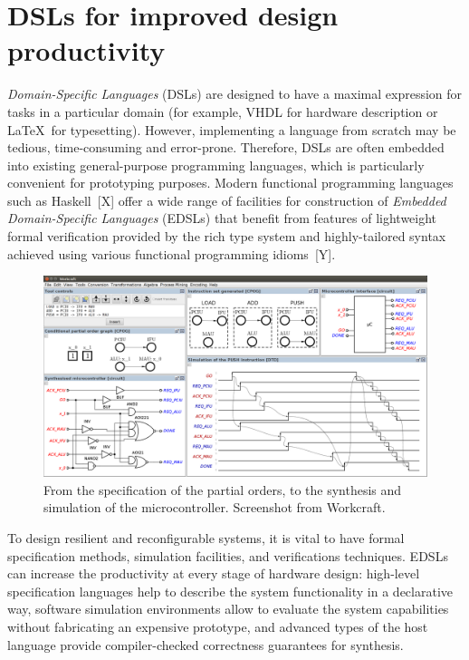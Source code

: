 \documentclass[conference]{IEEEtran}
\begin{document}
\section{DSLs for improved design productivity\label{sec:dsl}}

\emph{Domain-Specific Languages} (DSLs) are designed to have a maximal expression for
tasks in a particular domain (for example, VHDL for hardware description or
\LaTeX~for typesetting). However, implementing a language from scratch may be tedious,
time-consuming and error-prone. Therefore, DSLs are often embedded into existing general-purpose programming languages, which is particularly convenient for
prototyping purposes.
Modern functional programming languages such as Haskell~[X] offer a
wide range of facilities for construction of \emph{Embedded Domain-Specific Languages}
(EDSLs) that benefit from features of lightweight formal verification provided by
the rich type system and highly-tailored syntax achieved using various functional
programming idioms~[Y].

\begin{figure}[ht!]
\begin{center}
    \includegraphics[width=\linewidth]{FIG/screen.png}
    \caption{From the specification of the partial orders, to the synthesis and simulation
    of the microcontroller. Screenshot from Workcraft.}
    \label{fig:screenshot}
\end{center}
\end{figure}

To design resilient and reconfigurable systems, it is vital to have formal
specification methods, simulation facilities, and verifications techniques.
EDSLs can increase the productivity at every stage of hardware design:
high-level specification
languages help to describe the system functionality in a declarative way, software
simulation environments allow to evaluate the system capabilities
without fabricating an expensive prototype, and advanced types of the host language
provide compiler-checked correctness guarantees for synthesis.
\end{document}
